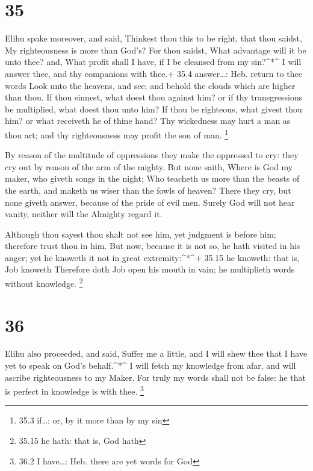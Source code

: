\hypertarget{section-34}{%
\section{35}\label{section-34}}

 Elihu spake moreover, and said,  Thinkest thou
this to be right, that thou saidst, My righteousness is more than God's?
 For thou saidst, What advantage will it be unto thee? and,
What profit shall I have, if I be cleansed from my sin?\^{}*\^{}
 I will answer thee, and thy companions with thee.+ 35.4
answer\ldots: Heb. return to thee words  Look unto the
heavens, and see; and behold the clouds which are higher than thou.
 If thou sinnest, what doest thou against him? or if thy
transgressions be multiplied, what doest thou unto him?  If
thou be righteous, what givest thou him? or what receiveth he of thine
hand?  Thy wickedness may hurt a man as thou art; and thy
righteousness may profit the son of man. \footnote{35.3 if\ldots: or, by
  it more than by my sin}

 By reason of the multitude of oppressions they make the
oppressed to cry: they cry out by reason of the arm of the mighty.
 But none saith, Where is God my maker, who giveth songs in
the night;  Who teacheth us more than the beasts of the
earth, and maketh us wiser than the fowls of heaven?  There
they cry, but none giveth answer, because of the pride of evil men.
 Surely God will not hear vanity, neither will the Almighty
regard it.

 Although thou sayest thou shalt not see him, yet judgment
is before him; therefore trust thou in him.  But now,
because it is not so, he hath visited in his anger; yet he knoweth it
not in great extremity:\^{}*\^{}+ 35.15 he knoweth: that is, Job knoweth
 Therefore doth Job open his mouth in vain; he multiplieth
words without knowledge. \footnote{35.15 he hath: that is, God hath}

\hypertarget{section-35}{%
\section{36}\label{section-35}}

 Elihu also proceeded, and said,  Suffer me a
little, and I will shew thee that I have yet to speak on God's
behalf.\^{}*\^{}  I will fetch my knowledge from afar, and
will ascribe righteousness to my Maker.  For truly my words
shall not be false: he that is perfect in knowledge is with thee.
\footnote{36.2 I have\ldots: Heb. there are yet words for God}

